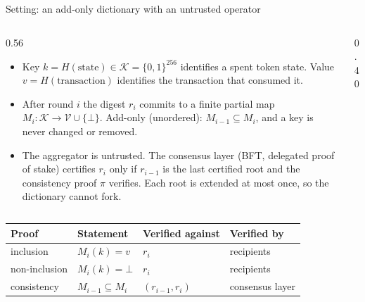 \documentclass[aspectratio=169,10pt]{beamer}
\newcommand{\K}{\mathcal{K}}
\newcommand{\V}{\mathcal{V}}
\begin{document}
\begin{frame}{Setting: an add-only dictionary with an untrusted operator}
\begin{columns}[T]
\begin{column}{0.56\textwidth}
\small
\begin{itemize}
  \item Key $k = H(\text{state}) \in \K = \{0,1\}^{256}$ identifies a spent token state. Value $v = H(\text{transaction})$ identifies the transaction that consumed it.
  \item After round $i$ the digest $r_i$ commits to a finite partial map $M_i\colon \K \to \V \cup \{\bot\}$. Add-only (unordered): $M_{i-1} \subseteq M_i$, and a key is never changed or removed.
  \item The aggregator is untrusted. The consensus layer (BFT, delegated proof of stake) certifies $r_i$ only if $r_{i-1}$ is the last certified root and the consistency proof $\pi$ verifies. Each root is extended at most once, so the dictionary cannot fork.
\end{itemize}
\end{column}
\begin{column}{0.40\textwidth}
\centering
{}
\end{column}
\end{columns}

\vspace{1mm}
\footnotesize
\begin{tabular}{@{}llll@{}}
\toprule
Proof & Statement & Verified against & Verified by \\
\midrule
inclusion & $M_i(k) = v$ & $r_i$ & recipients \\
non-inclusion & $M_i(k) = \bot$ & $r_i$ & recipients \\
consistency & $M_{i-1} \subseteq M_i$ & $(r_{i-1}, r_i)$ & consensus layer \\
\bottomrule
\end{tabular}
\end{frame}
\end{document}
